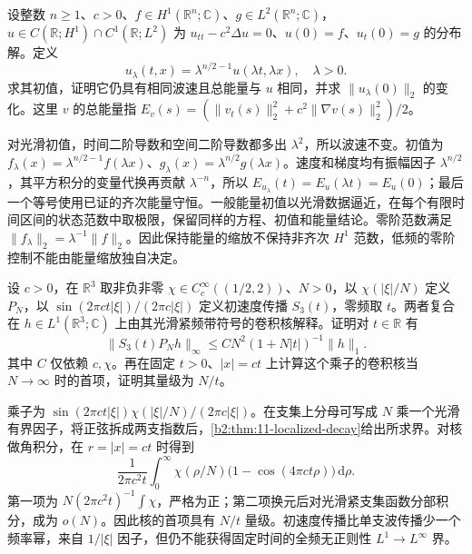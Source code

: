 \begin{exercise}\label{b2:ex:11-energy-scaling}
设整数 \(n\geq1\)、\(c>0\)、\(f\in H^1(\mathbb R^n;\mathbb C)\)、\(g\in L^2(\mathbb R^n;\mathbb C)\)，\(u\in C(\mathbb R;H^1)\cap C^1(\mathbb R;L^2)\) 为 \(u_{tt}-c^2\Delta u=0\)、\(u(0)=f\)、\(u_t(0)=g\) 的分布解。定义
\[
 u_\lambda(t,x)=\lambda^{n/2-1}u(\lambda t,\lambda x),\quad\lambda>0.
\]
求其初值，证明它仍具有相同波速且总能量与 \(u\) 相同，并求 \(\|u_\lambda(0)\|_2\) 的变化。这里 \(v\) 的总能量指 \(E_v(s)=(\|v_t(s)\|_2^2+c^2\|\nabla v(s)\|_2^2)/2\)。
\end{exercise}
\begin{solution}
对光滑初值，时间二阶导数和空间二阶导数都多出 \(\lambda^2\)，所以波速不变。初值为 \(f_\lambda(x)=\lambda^{n/2-1}f(\lambda x)\)、\(g_\lambda(x)=\lambda^{n/2}g(\lambda x)\)。速度和梯度均有振幅因子 \(\lambda^{n/2}\)，其平方积分的变量代换再贡献 \(\lambda^{-n}\)，所以 \(E_{u_\lambda}(t)=E_u(\lambda t)=E_u(0)\)；最后一个等号使用已证的齐次能量守恒。一般能量初值以光滑数据逼近，在每个有限时间区间的状态范数中取极限，保留同样的方程、初值和能量结论。零阶范数满足 \(\|f_\lambda\|_2=\lambda^{-1}\|f\|_2\)。因此保持能量的缩放不保持非齐次 \(H^1\) 范数，低频的零阶控制不能由能量缩放独自决定。
\end{solution}

\begin{optionalexercise}\label{b2:ex:11-velocity-band-loss}
设 \(c>0\)，在 \(\mathbb R^3\) 取非负非零 \(\chi\in C_c^\infty((1/2,2))\)、\(N>0\)，以 \(\chi(|\xi|/N)\) 定义 \(P_N\)，以 \(\sin(2\pi ct|\xi|)/(2\pi c|\xi|)\) 定义初速度传播 \(S_3(t)\)，零频取 \(t\)。两者复合在 \(h\in L^1(\mathbb R^3;\mathbb C)\) 上由其光滑紧频带符号的卷积核解释。证明对 \(t\in\mathbb R\) 有
\[
 \|S_3(t)P_Nh\|_\infty\leq C N^2(1+N|t|)^{-1}\|h\|_1.
\]
其中 \(C\) 仅依赖 \(c,\chi\)。再在固定 \(t>0\)、\(|x|=ct\) 上计算这个乘子的卷积核当 \(N\to\infty\) 时的首项，证明其量级为 \(N/t\)。
\end{optionalexercise}
\begin{solution}
乘子为 \(\sin(2\pi ct|\xi|)\chi(|\xi|/N)/(2\pi c|\xi|)\)。在支集上分母可写成 \(N\) 乘一个光滑有界因子，将正弦拆成两支指数后，\cref{b2:thm:11-localized-decay}给出所求界。对核做角积分，在 \(r=|x|=ct\) 时得到
\[
 \dfrac1{2\pi c^2t}\int_0^\infty
 \chi(\rho/N)\bigl(1-\cos(4\pi ct\rho)\bigr)\,\mathrm{d}\rho.
\]
第一项为 \(N(2\pi c^2t)^{-1}\int\chi\)，严格为正；第二项换元后对光滑紧支集函数分部积分，成为 \(o(N)\)。因此核的首项具有 \(N/t\) 量级。初速度传播比单支波传播少一个频率幂，来自 \(1/|\xi|\) 因子，但仍不能获得固定时间的全频无正则性 \(L^1\to L^\infty\) 界。
\end{solution}

